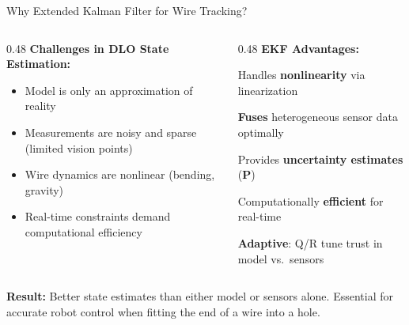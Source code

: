 \documentclass[aspectratio=169]{beamer}
\begin{document}
\begin{frame}{Why Extended Kalman Filter for Wire Tracking?}

  \begin{columns}[T]
    \begin{column}{0.48\textwidth}
      \textbf{Challenges in DLO State Estimation:}
      \begin{itemize}
        \item Model is only an approximation of reality
        \item Measurements are noisy and sparse (limited vision points)
        \item Wire dynamics are nonlinear (bending, gravity)
        \item Real-time constraints demand computational efficiency
      \end{itemize}
    \end{column}

    \begin{column}{0.48\textwidth}
      \textbf{EKF Advantages:}
      \begin{itemize*}
        \item \checkmark \quad Handles \textbf{nonlinearity} via linearization
        \item \checkmark \quad \textbf{Fuses} heterogeneous sensor data\\
        \quad \quad optimally
        \item \checkmark \quad Provides \textbf{uncertainty estimates} ($\mathbf{P}$)
        \item \checkmark \quad Computationally \textbf{efficient} for real-time
        \item \checkmark \quad \textbf{Adaptive}: Q/R tune trust in model vs.\ sensors
      \end{itemize*}
    \end{column}
  \end{columns}

  \vspace{0.8em}
  \begin{tcolorbox}[colback=compgreen!15, colframe=compgreen, arc=4pt, boxrule=1pt]
    \small
    \textbf{Result:} Better state estimates than either model or sensors alone. Essential for accurate robot control when fitting the end of a wire into a hole.
  \end{tcolorbox}

\end{frame}
\end{document}
